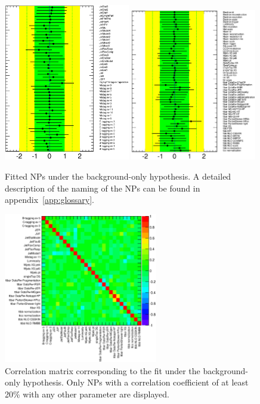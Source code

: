 \begin{figure}[!tp]
\begin{center}
\includegraphics[trim=0cm 0cm 1.5cm 0cm, clip=true, width=0.49\textwidth]{Analysis/Figures_HtX/detectorUNC600_singlet_new.eps}
\includegraphics[trim=0cm 0cm 1.5cm 0cm, clip=true, width=0.49\textwidth]{Analysis/Figures_HtX/otherUNC600_singlet_new.eps}
\caption{Fitted NPs under the background-only hypothesis. A detailed description of the naming of the NPs can be found in appendix~\ref{app:glossary}.}
\label{fig:HtX_fit} 
\end{center}
\begin{center}
\includegraphics[width=0.6\textwidth]{Analysis/Figures_HtX/CorrMat_HtX.eps}
\caption{Correlation matrix corresponding to the fit under the background-only hypothesis.
Only NPs with a correlation coefficient of at least 20\% with any other parameter are displayed.}
\label{fig:corrmat_HtX} 
\end{center}
\end{figure}

